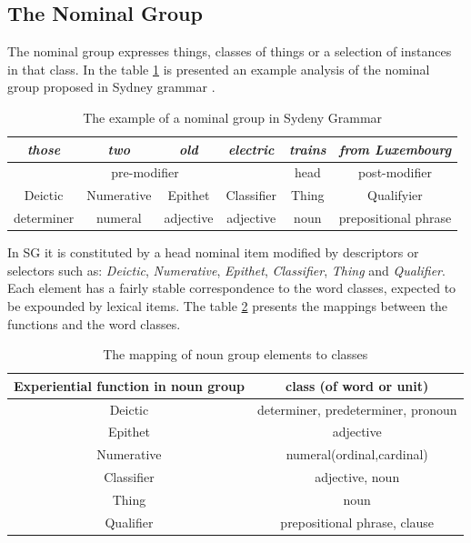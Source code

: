 \subsection{The Nominal Group}
\label{sec:nominal-group}
The nominal group expresses things, classes of things or a selection of instances in that class. In the table \ref{tab:example-ng} is presented an example analysis of the nominal group proposed in Sydney grammar \citep[364--369]{Halliday2013}. 
\begin{table}[!ht]
	\begin{tabular}{|c|c|c|c|c|c|}
		\hline
		\textit{those} & \textit{two} & \textit{old} & \textit{electric} & \textit{trains} & \textit{from Luxembourg} \\ \hline
		\multicolumn{4}{|c|}{pre-modifier}                               & head            & post-modifier            \\ \hline
		Deictic        & Numerative   & Epithet      & Classifier        & Thing           & Qualifyier               \\ \hline
		determiner     & numeral      & adjective    & adjective         & noun            & prepositional phrase     \\ \hline
	\end{tabular}
	\caption{The example of a nominal group in Sydeny Grammar}
	\label{tab:example-ng}
\end{table}

In SG it is constituted by a head nominal item modified by descriptors or selectors such as: \textit{Deictic}, \textit{Numerative}, \textit{Epithet}, \textit{Classifier}, \textit{Thing} and \textit{Qualifier}. Each element has a fairly stable correspondence to the word classes, expected to be expounded by lexical items. The table \ref{tab:function-pos-mapping} presents the mappings between the functions and the word classes.

\begin{table}[h]
	\begin{tabular}{|c|c|}
		\hline
		\textbf{Experiential function in noun group} & \textbf{class (of word or unit)} \\ \hline
		Deictic                             & determiner, predeterminer, pronoun \\ \hline
		Epithet                             & adjective                    \\ \hline
		Numerative                          & numeral(ordinal,cardinal)    \\ \hline
		Classifier                          & adjective, noun              \\ \hline
		Thing                               & noun                         \\ \hline
		Qualifier                           & prepositional phrase, clause \\ \hline
	\end{tabular}
	\caption{The mapping of noun group elements to classes}
	\label{tab:function-pos-mapping}
\end{table}

